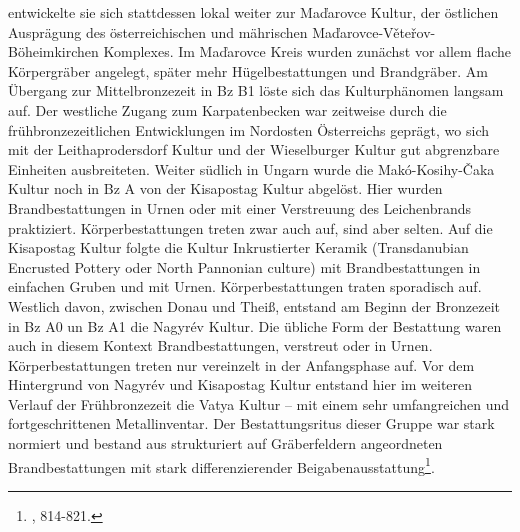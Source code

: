 \documentclass[openany,twoside,twocolumn]{book}
\let\rmarkdownfootnote\footnote%
\def\footnote{\protect\rmarkdownfootnote}
\begin{document}
entwickelte sie sich stattdessen lokal weiter zur Maďarovce Kultur, der
östlichen Ausprägung des österreichischen und mährischen
Maďarovce-Věteřov-Böheimkirchen Komplexes. Im Maďarovce Kreis wurden
zunächst vor allem flache Körpergräber angelegt, später mehr
Hügelbestattungen und Brandgräber. Am Übergang zur Mittelbronzezeit in
Bz B1 löste sich das Kulturphänomen langsam auf. Der westliche Zugang
zum Karpatenbecken war zeitweise durch die frühbronzezeitlichen
Entwicklungen im Nordosten Österreichs geprägt, wo sich mit der
Leithaprodersdorf Kultur und der Wieselburger Kultur gut abgrenzbare
Einheiten ausbreiteten. Weiter südlich in Ungarn wurde die
Makó-Kosihy-Čaka Kultur noch in Bz A von der Kisapostag Kultur abgelöst.
Hier wurden Brandbestattungen in Urnen oder mit einer Verstreuung des
Leichenbrands praktiziert. Körperbestattungen treten zwar auch auf, sind
aber selten. Auf die Kisapostag Kultur folgte die Kultur Inkrustierter
Keramik (Transdanubian Encrusted Pottery oder North Pannonian culture)
mit Brandbestattungen in einfachen Gruben und mit Urnen.
Körperbestattungen traten sporadisch auf. Westlich davon, zwischen Donau
und Theiß, entstand am Beginn der Bronzezeit in Bz A0 un Bz A1 die
Nagyrév Kultur. Die übliche Form der Bestattung waren auch in diesem
Kontext Brandbestattungen, verstreut oder in Urnen. Körperbestattungen
treten nur vereinzelt in der Anfangsphase auf. Vor dem Hintergrund von
Nagyrév und Kisapostag Kultur entstand hier im weiteren Verlauf der
Frühbronzezeit die Vatya Kultur -- mit einem sehr umfangreichen und
fortgeschrittenen Metallinventar. Der Bestattungsritus dieser Gruppe war
stark normiert und bestand aus strukturiert auf Gräberfeldern
angeordneten Brandbestattungen mit stark differenzierender
Beigabenausstattung\footnote{\textcite{markova_slovakia_2013}, 814-821.}.
\end{document}
